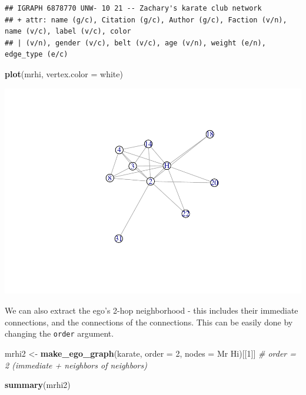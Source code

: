 \documentclass[
]{book}
\newenvironment{Shaded}{\begin{snugshade}}{\end{snugshade}}
\newcommand{\AttributeTok}[1]{\textcolor[rgb]{0.13,0.29,0.53}{#1}}
\newcommand{\CommentTok}[1]{\textcolor[rgb]{0.56,0.35,0.01}{\textit{#1}}}
\newcommand{\DecValTok}[1]{\textcolor[rgb]{0.00,0.00,0.81}{#1}}
\newcommand{\FunctionTok}[1]{\textcolor[rgb]{0.13,0.29,0.53}{\textbf{#1}}}
\newcommand{\NormalTok}[1]{#1}
\newcommand{\OtherTok}[1]{\textcolor[rgb]{0.56,0.35,0.01}{#1}}
\newcommand{\StringTok}[1]{\textcolor[rgb]{0.31,0.60,0.02}{#1}}
\begin{document}
\begin{verbatim}
## IGRAPH 6878770 UNW- 10 21 -- Zachary's karate club network
## + attr: name (g/c), Citation (g/c), Author (g/c), Faction (v/n), name (v/c), label (v/c), color
## | (v/n), gender (v/c), belt (v/c), age (v/n), weight (e/n), edge_type (e/c)
\end{verbatim}

\begin{Shaded}
\begin{Highlighting}[]
\FunctionTok{plot}\NormalTok{(mrhi, }\AttributeTok{vertex.color =} \StringTok{\textquotesingle{}white\textquotesingle{}}\NormalTok{)}
\end{Highlighting}
\end{Shaded}

\includegraphics{bookdown-demo_files/figure-latex/unnamed-chunk-47-1.pdf}

We can also extract the ego's 2-hop neighborhood - this includes their immediate connections, and the connections of the connections. This can be easily done by changing the \texttt{order} argument.

\begin{Shaded}
\begin{Highlighting}[]
\NormalTok{mrhi2 }\OtherTok{\textless{}{-}} \FunctionTok{make\_ego\_graph}\NormalTok{(karate, }\AttributeTok{order =} \DecValTok{2}\NormalTok{, }\AttributeTok{nodes =} \StringTok{\textquotesingle{}Mr Hi\textquotesingle{}}\NormalTok{)[[}\DecValTok{1}\NormalTok{]] }\CommentTok{\# order = 2 (immediate + neighbors of neighbors)}

\FunctionTok{summary}\NormalTok{(mrhi2)}
\end{Highlighting}
\end{Shaded}
\end{document}
